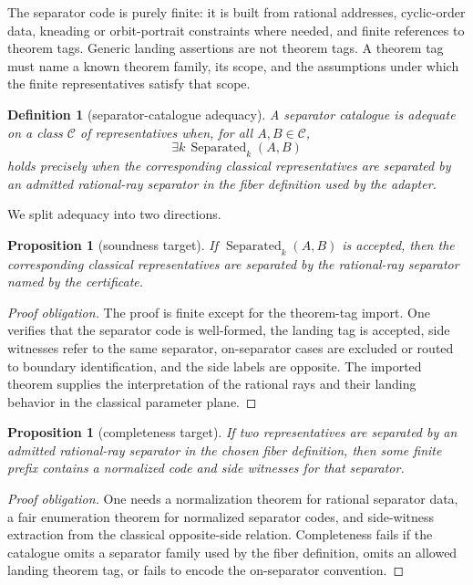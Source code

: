 \documentclass[11pt]{amsart}
\newtheorem{proposition}[theorem]{Proposition}
\newtheorem{definition}[theorem]{Definition}
\begin{document}
The separator code is purely finite: it is built from rational addresses, cyclic-order data, kneading or orbit-portrait constraints where needed, and finite references to theorem tags.  Generic landing assertions are not theorem tags.  A theorem tag must name a known theorem family, its scope, and the assumptions under which the finite representatives satisfy that scope.

\begin{definition}[separator-catalogue adequacy]
A separator catalogue is adequate on a class \(\mathcal C\) of representatives when, for all \(A,B\in\mathcal C\),
\[
        \exists k\,\operatorname{Separated}_k(A,B)
\]
holds precisely when the corresponding classical representatives are separated by an admitted rational-ray separator in the fiber definition used by the adapter.
\end{definition}

We split adequacy into two directions.

\begin{proposition}[soundness target]
If \(\operatorname{Separated}_k(A,B)\) is accepted, then the corresponding classical representatives are separated by the rational-ray separator named by the certificate.
\end{proposition}

\begin{proof}[Proof obligation]
The proof is finite except for the theorem-tag import.  One verifies that the separator code is well-formed, the landing tag is accepted, side witnesses refer to the same separator, on-separator cases are excluded or routed to boundary identification, and the side labels are opposite.  The imported theorem supplies the interpretation of the rational rays and their landing behavior in the classical parameter plane.
\end{proof}

\begin{proposition}[completeness target]
If two representatives are separated by an admitted rational-ray separator in the chosen fiber definition, then some finite prefix contains a normalized code and side witnesses for that separator.
\end{proposition}

\begin{proof}[Proof obligation]
One needs a normalization theorem for rational separator data, a fair enumeration theorem for normalized separator codes, and side-witness extraction from the classical opposite-side relation.  Completeness fails if the catalogue omits a separator family used by the fiber definition, omits an allowed landing theorem tag, or fails to encode the on-separator convention.
\end{proof}
\end{document}
